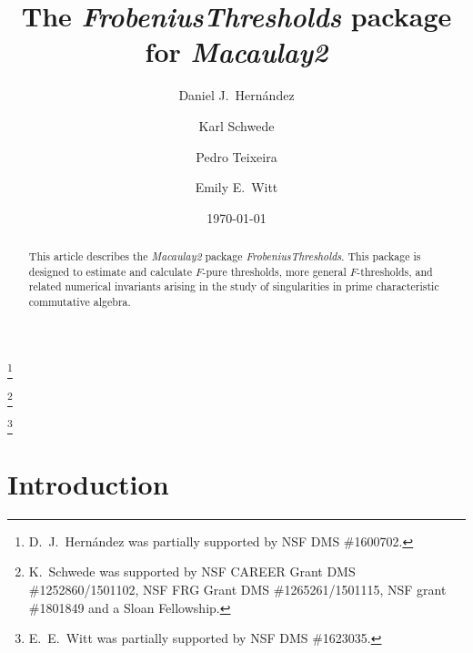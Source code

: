 \documentclass{amsart}
\begin{document}
\title[]{The \emph{FrobeniusThresholds} package for \emph{Macaulay2}}

\author[]{Daniel J.\ Hern\'andez}
\address{Department of Mathematics, University of Kansas, Lawrence, KS~66045, USA}
\thanks{D.~J.~Hern\'andez was partially supported by NSF DMS \#1600702.}



\author[]{Karl Schwede}
\address{Department of Mathematics, University of Utah, Salt Lake City, UT~84112, USA}
\thanks{K.~Schwede was supported by NSF CAREER Grant DMS \#1252860/1501102, NSF FRG Grant DMS \#1265261/1501115, NSF grant \#1801849 and a Sloan Fellowship.}

\author[]{Pedro Teixeira}
\address{Department of Mathematics, Knox College, Galesburg, IL~61401, USA}

\author[]{Emily E.\ Witt}
\address{Department of Mathematics, University of Kansas, Lawrence, KS~66045, USA}
\thanks{E.~E.~Witt was partially supported by NSF DMS \#1623035.}
\date{\today}

\begin{abstract}
   This article describes the \emph{Macaulay2} package \emph{FrobeniusThresholds}.
   This package is designed to estimate and calculate $F$-pure thresholds, more general $F$-thresholds, and related numerical invariants arising in the study of singularities in prime characteristic commutative algebra.
\end{abstract}



\maketitle

\section{Introduction}

\end{document}
